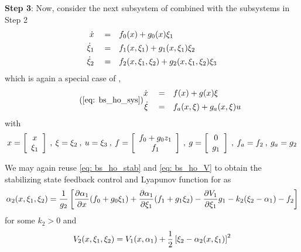 \documentclass[12pt]{ucthesis}
\begin{document}
\noindent \textbf{Step 3}: Now, consider the next subsystem of  combined with the subsystems in Step 2
	\begin{equation} \label{eq: bs_ho_x3}
		\begin{aligned}
			\dot{x} 		\quad=&\quad f_0(x) + g_0(x)\xi_1 \\
			\dot{\xi}_1 	\quad=&\quad f_1(x,\xi_1) + g_1(x,\xi_1)\xi_2 \\
			\dot{\xi}_2 	\quad=&\quad f_2(x,\xi_1,\xi_2)	+ g_2(x,\xi_1,\xi_2)\xi_3
		\end{aligned}
	\end{equation}
which is again a special case of , 
	\begin{equation} \tag{\ref{eq: bs_ho_sys}}
		\begin{aligned}
			\dot{x} 	\quad=&\quad f(x)+g(x)\virt 			\\
			\dot{\virt} \quad=&\quad f_a(x,\virt)+g_a(x,\virt)u
		\end{aligned}
	\end{equation}
with 
	\begin{equation*} 
		x = \left[ \begin{array}{c} x \\ \xi_1 \end{array}\right] \:,\: \xi = \xi_2 \:,\: u=\xi_3 \:,\: f = \left[ \begin{array}{c} f_0 + g_0z_1 \\ f_1 \end{array}\right] \:,\: g = \left[ \begin{array}{c} 0 \\ g_1 \end{array}\right] \:,\: f_a = f_2 \:,\: g_a = g_2
	\end{equation*}

We may again reuse \ref{eq: bs_ho_stab} and \ref{eq: bs_ho_V} to obtain the stabilizing state feedback control and Lyapunov function for  as
	\begin{equation} \label{eq: bs_ho_u3}
		\alpha_2(x,\xi_1,\xi_2) = \frac{1}{g_2} \left[  \frac{\partial\alpha_1}{\partial x}(f_0+g_0\xi_1) + \frac{\partial\alpha_1}{\partial\xi_1}(f_1+g_1\xi_2) - \frac{\partial V_1}{\partial\xi_1}g_1 - k_2(\xi_2 - \alpha_1) - f_2 \right] 
	\end{equation}
for some $k_2>0$ and	
	\begin{equation} \label{eq: bs_ho_V3}
		V_2(x,\xi_1,\xi_2) = V_1(x,\alpha_1) + \frac{1}{2}\left[ \xi_2 - \alpha_2(x,\xi_1) \right]^2 
	\end{equation}
\end{document}
